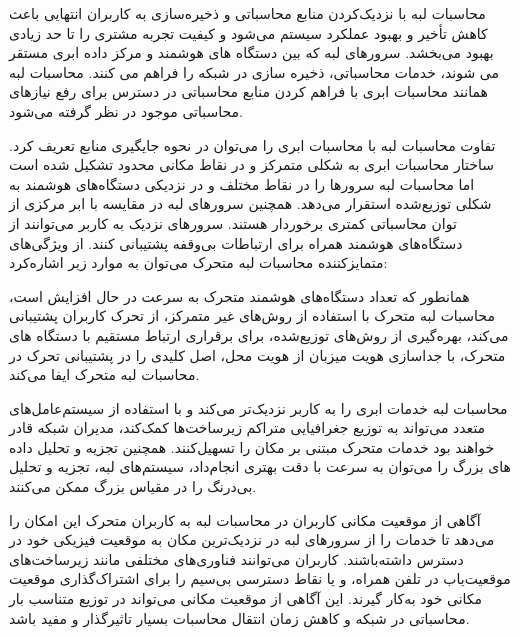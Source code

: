 محاسبات لبه با نزدیک‌کردن منابع محاسباتی و ذخیره‌سازی به کاربران انتهایی باعث کاهش تأخیر و بهبود عملکرد سیستم می‌شود و کیفیت تجربه مشتری را تا حد زیادی بهبود می‌بخشد. سرورهای لبه که بین دستگاه های هوشمند و مرکز داده ابری مستقر می شوند، خدمات محاسباتی، ذخیره سازی در شبکه را فراهم می کنند. محاسبات لبه همانند محاسبات ابری با فراهم کردن منابع محاسباتی در دسترس برای رفع نیازهای محاسباتی موجود در نظر گرفته می‌شود. 











تفاوت محاسبات لبه با محاسبات ابری را می‌توان در نحوه جایگیری منابع تعریف کرد. ساختار محاسبات ابری به شکلی متمرکز و در نقاط مکانی محدود تشکیل شده است اما محاسبات لبه سرورها را در نقاط مختلف و در نزدیکی دستگاه‌های هوشمند به شکلی توزیع‌شده استقرار می‌دهد. همچنین سرورهای لبه در مقایسه با ابر مرکزی از توان محاسباتی کمتری برخوردار هستند. سرورهای نزدیک به کاربر می‌توانند از دستگاه‌های هوشمند همراه برای ارتباطات بی‌وقفه پشتیبانی کنند. از ویژگی‌های متمایزکننده محاسبات لبه متحرک می‌توان به موارد زیر اشاره‌کرد:





همانطور که تعداد دستگاه‌های هوشمند متحرک به سرعت در حال افزایش است، محاسبات لبه متحرک با استفاده از روش‌های غیر متمرکز، از تحرک کاربران پشتیبانی می‌کند، بهره‌گیری از روش‌های توزیع‌شده، برای برقراری ارتباط مستقیم با دستگاه های متحرک، با جداسازی هویت میزبان از هویت محل، اصل کلیدی را در پشتیبانی تحرک در محاسبات لبه متحرک ایفا می‌کند.



محاسبات لبه خدمات ابری را به کاربر نزدیک‌تر می‌کند و با استفاده از سیستم‌عامل‌های متعدد می‌تواند به توزیع جغرافیایی متراکم زیرساخت‌ها کمک‌کند، مدیران شبکه قادر خواهند بود خدمات متحرک مبتنی بر مکان را تسهیل‌کنند. همچنین تجزیه و تحلیل داده های بزرگ را می‌توان به سرعت با دقت بهتری انجام‌داد، سیستم‌های لبه، تجزیه و تحلیل بی‌درنگ را در مقیاس بزرگ ممکن می‌کنند.



آگاهی از موقعیت مکانی کاربران در محاسبات لبه به کاربران متحرک این امکان را می‌دهد تا خدمات را از سرورهای لبه در نزدیک‌ترین مکان به موقعیت فیزیکی خود در دسترس داشته‌‌باشند. کاربران می‌توانند فناوری‌های مختلفی مانند زیرساخت‌های موقعیت‌یاب در تلفن همراه، و یا نقاط دسترسی بی‌سیم را برای اشتراک‌گذاری موقعیت مکانی خود به‌کار گیرند. این آگاهی از موقعیت مکانی می‌تواند در توزیع متناسب بار محاسباتی در شبکه و کاهش زمان انتقال محاسبات بسیار تاثیرگذار و مفید باشد.


